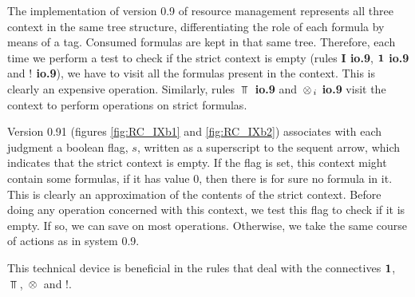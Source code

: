 The implementation of version 0.9 of resource management represents all three
context in the same tree structure, differentiating the role of each formula
by means of a tag. Consumed formulas are kept in that same tree. Therefore,
each time we perform a test to check if the strict context is empty (rules
{\bf I io.9}, {\bf ${\bf 1}$ io.9} and {\bf $!$ io.9}), we have to visit all the
formulas present in the context. This is clearly an expensive operation.
Similarly, rules {\bf $\Top$ io.9} and {\bf $\, \otimes \,_i$ io.9} visit the
context to perform operations on strict formulas.

Version 0.91 (figures \ref{fig:RC_IXb1} and \ref{fig:RC_IXb2}) associates
with each judgment a boolean flag, $s$, written as a superscript to the
sequent arrow, which indicates that the strict context is empty. If the flag
is set, this context might contain some formulas, if it has value $0$, then
there is for sure no formula in it. This is clearly an approximation of the
contents of the strict context. Before doing any operation concerned with
this context, we test this flag to check if it is empty. If so, we can save
on most operations. Otherwise, we take the same course of actions as in
system 0.9.

This technical device is beneficial in the rules that deal with the
connectives ${\bf 1}$, $\Top$, $\, \otimes \,$ and $!$.


